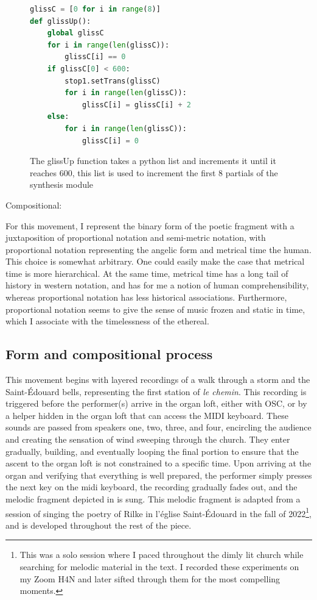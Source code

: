 \documentclass[12pt,twoside,maitrise]{dms_ks}
\theoremstyle{definition}
\begin{document}
{%

\begin{figure}[H]
\begin{lstlisting}[language=Python]
glissC = [0 for i in range(8)]
def glissUp():
    global glissC
    for i in range(len(glissC)):
        glissC[i] == 0
    if glissC[0] < 600:
        stop1.setTrans(glissC)
        for i in range(len(glissC)):
            glissC[i] = glissC[i] + 2
    else:
        for i in range(len(glissC)):
            glissC[i] = 0
\end{lstlisting}
\caption{The glissUp function takes a python list and increments it until it reaches 600, this list is used to increment the first 8 partials of the synthesis module}
\label{fig:glissup}
\end{figure}

Compositional:

For this movement, I represent the binary form of the poetic fragment with a juxtaposition of proportional notation and semi-metric notation, with proportional notation representing the angelic form and metrical time the human.
This choice is somewhat arbitrary.
One could easily make the case that metrical time is more hierarchical.
At the same time, metrical time has a long tail of history in western notation, and has for me a notion of human comprehensibility, whereas proportional notation has less historical associations.
Furthermore, proportional notation seems to give the sense of music frozen and static in time, which I associate with the timelessness of the ethereal.

\subsection{Form and compositional process}

This movement begins with layered recordings of a walk through a storm and the Saint-Édouard bells, representing the first station of \textit{le chemin}.
This recording is triggered before the performer(s) arrive in the organ loft, either with OSC, or by a helper hidden in the organ loft that can access the MIDI keyboard.  
These sounds are passed from speakers one, two, three, and four, encircling the audience and creating the sensation of wind sweeping through the church. 
They enter gradually, building, and eventually looping the final portion to ensure that the ascent to the organ loft is not constrained to a specific time. 
Upon arriving at the organ and verifying that everything is well prepared, the performer simply presses the next key on the midi keyboard, the recording gradually fades out, and the melodic fragment depicted in  is sung.
This melodic fragment is adapted from a session of singing the poetry of Rilke in l'église Saint-Édouard in the fall of 2022\footnote{This was a solo session where I paced throughout the dimly lit church while searching for melodic material in the text. I recorded these experiments on my Zoom H4N and later sifted through them for the most compelling moments.}, and is developed throughout the rest of the piece.

}
\end{document}
